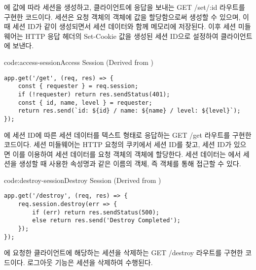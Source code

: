 \은 에  값에 따라 세션을 생성하고, 클라이언트에 응답을 보내는 GET /set/:id 라우트를 구현한 코드이다. 세션은 요청 객체의  객체에 값을 할당함으로써 생성할 수 있으며, 이때 세션 ID가 같이 생성되면서 세션 데이터와 함께 메모리에 저장된다. 이후 세션 미들웨어는 HTTP 응답 헤더의 Set-Cookie 값을 생성된 세션 ID으로 설정하여 클라이언트에 보낸다.

\begin{codeenv}{code:access-session}{Access Session (Derived from )}\begin{verbatim}
app.get('/get', (req, res) => {
    const { requester } = req.session;
    if (!requester) return res.sendStatus(401);
    const { id, name, level } = requester;
    return res.send(`id: ${id} / name: ${name} / level: ${level}`);
});
\end{verbatim}
\end{codeenv}

\은 에 세션 ID에 따른 세션 데이터를 텍스트 형태로 응답하는 GET /get 라우트를 구현한 코드이다. 세션 미들웨어는 HTTP 요청의 쿠키에서 세션 ID를 찾고, 세션 ID가 있으면 이를 이용하여 세션 데이터를 요청 객체의  객체에 할당한다. 세션 데이터는 에서 세션을 생성할 때 사용한 속성명과 같은 이름의 객체, 즉  객체를 통해 접근할 수 있다.

\begin{codeenv}{code:destroy-session}{Destroy Session (Derived from )}\begin{verbatim}
app.get('/destroy', (req, res) => {
    req.session.destroy(err => {
        if (err) return res.sendStatus(500);
        else return res.send('Destroy Completed');
    });
});
\end{verbatim}
\end{codeenv}

\은 에 요청한 클라이언트에 해당하는 세션을 삭제하는 GET /destroy 라우트를 구현한 코드이다. 로그아웃 기능은 세션을 삭제하여 수행된다.


